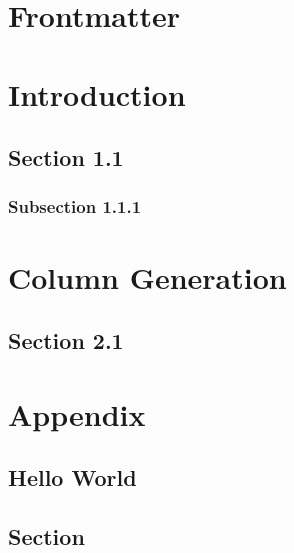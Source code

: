 \documentclass[10pt, a4paper, fontset=none, no-math]{ctexbook}
\begin{document}
\frontmatter

\chapter{Frontmatter}
\lipsum[5-10]

\mainmatter

\chapter{Introduction}

\section{Section 1.1}

\lipsum[5-10]

\subsection{Subsection 1.1.1}

\lipsum[5-10]

\chapter{Column Generation}

\lipsum[5-10]

\section{Section 2.1}

\lipsum[5-10]

\backmatter

\chapter*{Appendix}

\lipsum[5-10]

\section*{Hello World}

\lipsum[10-20]

\section{Section}

\lipsum[5-10]


% 
\end{document}
